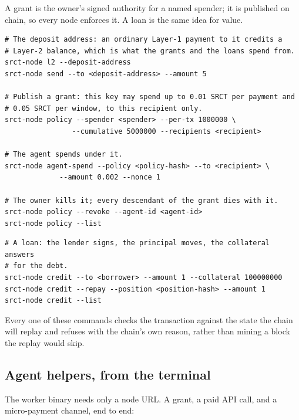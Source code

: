 \documentclass{article}
\begin{document}
A grant is the owner's signed authority for a named spender; it is published on
chain, so every node enforces it. A loan is the same idea for value.

\begin{verbatim}
# The deposit address: an ordinary Layer-1 payment to it credits a
# Layer-2 balance, which is what the grants and the loans spend from.
srct-node l2 --deposit-address
srct-node send --to <deposit-address> --amount 5

# Publish a grant: this key may spend up to 0.01 SRCT per payment and
# 0.05 SRCT per window, to this recipient only.
srct-node policy --spender <spender> --per-tx 1000000 \
                --cumulative 5000000 --recipients <recipient>

# The agent spends under it.
srct-node agent-spend --policy <policy-hash> --to <recipient> \
             --amount 0.002 --nonce 1

# The owner kills it; every descendant of the grant dies with it.
srct-node policy --revoke --agent-id <agent-id>
srct-node policy --list
\end{verbatim}

\begin{verbatim}
# A loan: the lender signs, the principal moves, the collateral answers
# for the debt.
srct-node credit --to <borrower> --amount 1 --collateral 100000000
srct-node credit --repay --position <position-hash> --amount 1
srct-node credit --list
\end{verbatim}

Every one of these commands checks the transaction against the state the chain
will replay and refuses with the chain's own reason, rather than mining a block
the replay would skip.

\subsection{Agent helpers, from the terminal}

The worker binary needs only a node URL. A grant, a paid API call, and a
micro-payment channel, end to end:
\end{document}
